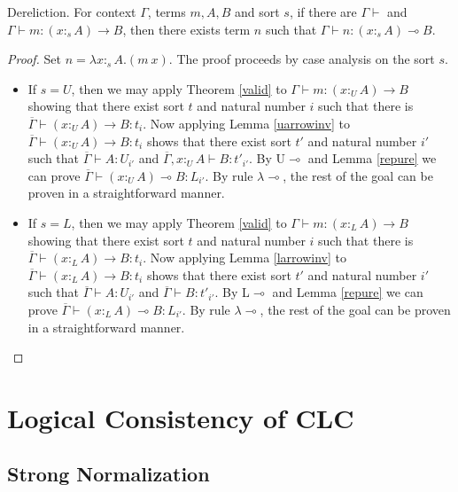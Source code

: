 \documentclass[sigplan,screen,review,anonymous]{acmart}
\newcommand{\rname}[1]{\textsc{\footnotesize #1}}
\newcommand{\utype}{:_{\scriptscriptstyle U}}
\newcommand{\ltype}{:_{\scriptscriptstyle L}}
\newcommand{\stype}[1]{:_#1}
\begin{document}
\begin{theorem}
  Dereliction. For context $\Gamma$, terms $m, A, B$ and sort $s$, if there are $\Gamma \vdash$ and $\Gamma \vdash m : (x \stype{s} A) \rightarrow B$, then there exists term $n$ such that $\Gamma \vdash n : (x \stype{s} A) \multimap B$.
\end{theorem}
\begin{proof}
  Set $n = \lambda x \stype{s} A . (m\ x)$. The proof proceeds by case analysis on the sort $s$.
  \begin{itemize}
    \item If $s = U$, then we may apply Theorem \ref{valid} to $\Gamma \vdash m : (x \utype A) \rightarrow B$ showing that there exist sort $t$ and natural number $i$ such that there is $\overline{\Gamma} \vdash (x \utype A) \rightarrow B : t_i$. Now applying Lemma \ref{uarrowinv} to $\overline{\Gamma} \vdash (x \utype A)\rightarrow B : t_i$ shows that there exist sort $t'$ and natural number $i'$ such that $\overline{\Gamma} \vdash A : U_{i'}$ and $\overline{\Gamma}, x \utype A \vdash B : t'_{i'}$. By \rname{U$\multimap$} and Lemma \ref{repure} we can prove $\overline{\Gamma} \vdash (x \utype A) \multimap B : L_{i'}$. By rule \rname{$\lambda$$\multimap$}, the rest of the goal can be proven in a straightforward manner.
    \item If $s = L$, then we may apply Theorem \ref{valid} to $\Gamma \vdash m : (x \ltype A) \rightarrow B$ showing that there exist sort $t$ and natural number $i$ such that there is $\overline{\Gamma} \vdash (x \ltype A) \rightarrow B : t_i$. Now applying Lemma \ref{larrowinv} to $\overline{\Gamma} \vdash (x \ltype A)\rightarrow B : t_i$ shows that there exist sort $t'$ and natural number $i'$ such that $\overline{\Gamma} \vdash A : U_{i'}$ and $\overline{\Gamma} \vdash B : t'_{i'}$. By \rname{L$\multimap$} and Lemma \ref{repure} we can prove $\overline{\Gamma} \vdash (x \ltype A) \multimap B : L_{i'}$. By rule \rname{$\lambda$$\multimap$}, the rest of the goal can be proven in a straightforward manner.
  \end{itemize}
\end{proof}

\section{Logical Consistency of CLC}

\subsection{Strong Normalization}
\end{document}
